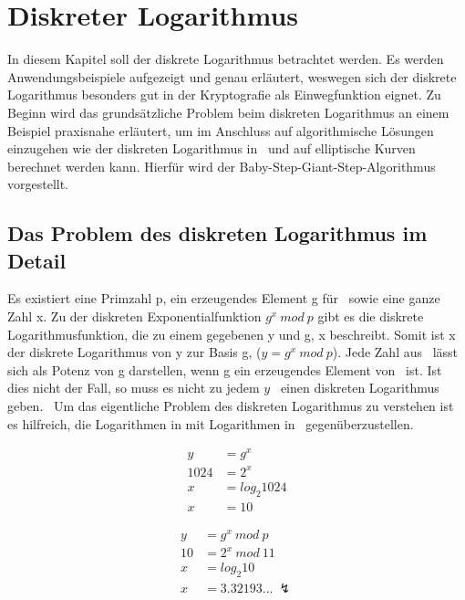 \section{Diskreter Logarithmus}\label{Kapitel Diskreter Logarithmus}
	In diesem Kapitel soll der diskrete Logarithmus betrachtet werden. Es werden Anwendungsbeispiele aufgezeigt und genau erläutert, weswegen sich der diskrete Logarithmus besonders gut in der Kryptografie als Einwegfunktion eignet. Zu Beginn wird das grundsätzliche Problem beim diskreten Logarithmus an einem Beispiel praxisnahe erläutert, um im Anschluss auf algorithmische Lösungen einzugehen wie der diskreten Logarithmus in \myZPStern~und auf elliptische Kurven berechnet werden kann. Hierfür wird der Baby-Step-Giant-Step-Algorithmus vorgestellt.

	\subsection{Das Problem des diskreten Logarithmus im Detail}\label{Das Problem des diskreten Logarithmus im Detail}
		Es existiert eine Primzahl p, ein erzeugendes Element g für \myZPStern~sowie eine ganze Zahl x. Zu der diskreten Exponentialfunktion $g^x~mod~p$ gibt es die diskrete Logarithmusfunktion, die zu einem gegebenen y und g, x beschreibt. Somit ist x der diskrete Logarithmus von y zur Basis g, ($y = g^x~mod~p$). Jede Zahl aus \myZPStern~lässt sich als Potenz von g darstellen, wenn g ein erzeugendes Element von \myZPStern~ist. Ist dies nicht der Fall, so muss es nicht zu jedem $y$ \myin \myZPStern~einen diskreten Logarithmus geben.~\cite{Kryptografie:in:Theorie:und:Praxis} Um das eigentliche Problem des diskreten Logarithmus zu verstehen ist es hilfreich, die Logarithmen in  mit Logarithmen in \myZPStern~gegenüberzustellen.
		\begin{minipage}{0.24\textwidth}
			\begin{equation}
			\begin{aligned}
			y &= g^x\\
			1024 &= 2^x\\
			x &= log_2 1024\\
			x &= 10
			\end{aligned}
			\label{Gleichung Log in Z}
			\end{equation}
		\end{minipage}
		\begin{minipage}{0.24\textwidth}
			\begin{equation}
			\begin{aligned}
			y &= g^x~mod~p\\
			10 &= 2^x~mod~11\\
			x &= log_2 10\\
			x &= 3.32193...~\lightning
			\end{aligned}
			\label{Gleichung Log in ZP}
			\end{equation}
		\end{minipage}

